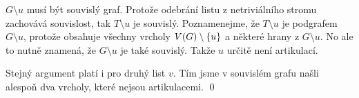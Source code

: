 \documentclass[11pt,a4paper]{article}
\begin{document}
\begin{solution}
\begin{enumerate}[1)]
    $G \setminus u$ musí být souvislý graf. Protože odebrání listu z netriviálního stromu zachovává souvislost, 
    tak $T \setminus u$ je souvislý. Poznamenejme, že $T \setminus u$ je podgrafem $G \setminus u$, protože obsahuje
    všechny vrcholy $V(G) \setminus \left\lbrace u \right\rbrace$ a některé hrany z $G \setminus u$. No ale to nutně znamená, že 
    $G \setminus u$ je také souvislý. Takže $u$ určitě není artikulací.
    
    Stejný argument platí i pro druhý list $v$. Tím jsme v souvislém grafu našli alespoň dva vrcholy, které nejsou 
    artikulacemi.
    \hspace{\fill}\qed
\end{enumerate}
\vspace{-1em}
\end{solution}

\newpage
\end{document}
